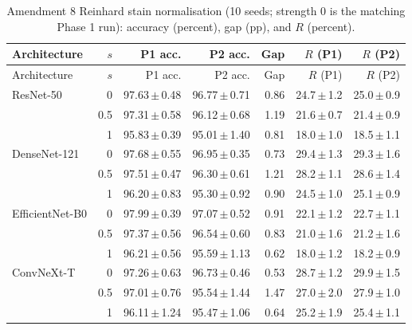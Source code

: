 {\footnotesize
\setlength{\tabcolsep}{3.5pt}
\begin{longtable}{lrrrrrr}
\caption{Amendment 8 Reinhard stain normalisation (10 seeds; strength 0 is the matching Phase 1 run): accuracy (percent), gap (pp), and $R$ (percent).}\label{r:tab:normal}\\
\toprule
Architecture & $s$ & P1 acc. & P2 acc. & Gap & $R$ (P1) & $R$ (P2) \\
\midrule
\endfirsthead
\toprule
Architecture & $s$ & P1 acc. & P2 acc. & Gap & $R$ (P1) & $R$ (P2) \\
\midrule
\endhead
\bottomrule
\endfoot
ResNet-50 & 0 & 97.63\,$\pm$\,0.48 & 96.77\,$\pm$\,0.71 & 0.86 & 24.7\,$\pm$\,1.2 & 25.0\,$\pm$\,0.9 \\
 & 0.5 & 97.31\,$\pm$\,0.58 & 96.12\,$\pm$\,0.68 & 1.19 & 21.6\,$\pm$\,0.7 & 21.4\,$\pm$\,0.9 \\
 & 1 & 95.83\,$\pm$\,0.39 & 95.01\,$\pm$\,1.40 & 0.81 & 18.0\,$\pm$\,1.0 & 18.5\,$\pm$\,1.1 \\
DenseNet-121 & 0 & 97.68\,$\pm$\,0.55 & 96.95\,$\pm$\,0.35 & 0.73 & 29.4\,$\pm$\,1.3 & 29.3\,$\pm$\,1.6 \\
 & 0.5 & 97.51\,$\pm$\,0.47 & 96.30\,$\pm$\,0.61 & 1.21 & 28.2\,$\pm$\,1.1 & 28.6\,$\pm$\,1.4 \\
 & 1 & 96.20\,$\pm$\,0.83 & 95.30\,$\pm$\,0.92 & 0.90 & 24.5\,$\pm$\,1.0 & 25.1\,$\pm$\,0.9 \\
EfficientNet-B0 & 0 & 97.99\,$\pm$\,0.39 & 97.07\,$\pm$\,0.52 & 0.91 & 22.1\,$\pm$\,1.2 & 22.7\,$\pm$\,1.1 \\
 & 0.5 & 97.37\,$\pm$\,0.56 & 96.54\,$\pm$\,0.60 & 0.83 & 21.0\,$\pm$\,1.6 & 21.2\,$\pm$\,1.6 \\
 & 1 & 96.21\,$\pm$\,0.56 & 95.59\,$\pm$\,1.13 & 0.62 & 18.0\,$\pm$\,1.2 & 18.2\,$\pm$\,0.9 \\
ConvNeXt-T & 0 & 97.26\,$\pm$\,0.63 & 96.73\,$\pm$\,0.46 & 0.53 & 28.7\,$\pm$\,1.2 & 29.9\,$\pm$\,1.5 \\
 & 0.5 & 97.01\,$\pm$\,0.76 & 95.54\,$\pm$\,1.44 & 1.47 & 27.0\,$\pm$\,2.0 & 27.9\,$\pm$\,1.0 \\
 & 1 & 96.11\,$\pm$\,1.24 & 95.47\,$\pm$\,1.06 & 0.64 & 25.2\,$\pm$\,1.9 & 25.4\,$\pm$\,1.1 \\
\end{longtable}
}
